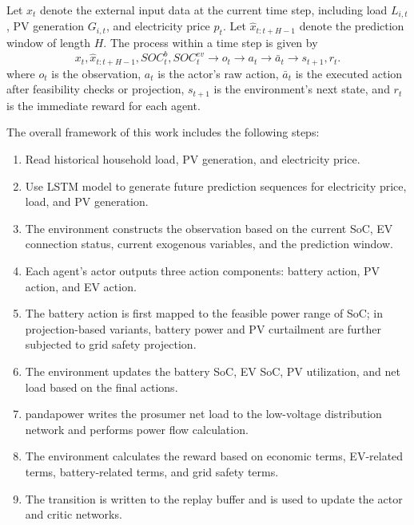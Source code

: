 Let \(x_t\) denote the external input data at the current time step, including load \(L_{i,t}\), PV generation \(G_{i,t}\), and electricity price \(p_t\). Let \(\hat{x}_{t:t+H-1}\) denote the prediction window of length \(H\). The process within a time step is given by
\[
  x_t,\hat{x}_{t:t+H-1},SOC^b_t,SOC^{ev}_t
  \rightarrow
  o_t
  \rightarrow
  a_t
  \rightarrow
  \bar a_t
  \rightarrow
  s_{t+1},r_t.
\]
where \(o_t\) is the observation, \(a_t\) is the actor's raw action, \(\bar a_t\) is the executed action after feasibility checks or projection, \(s_{t+1}\) is the environment's next state, and \(r_t\) is the immediate reward for each agent.

The overall framework of this work includes the following steps:
\begin{enumerate}
  \item Read historical household load, PV generation, and electricity price.
  \item Use LSTM model to generate future prediction sequences for electricity price, load, and PV generation.
  \item The environment constructs the observation based on the current SoC, EV connection status, current exogenous variables, and the prediction window.
  \item Each agent's actor outputs three action components: battery action, PV action, and EV action.
  \item The battery action is first mapped to the feasible power range of SoC; in projection-based variants, battery power and PV curtailment are further subjected to grid safety projection.
  \item The environment updates the battery SoC, EV SoC, PV utilization, and net load based on the final actions.
  \item pandapower writes the prosumer net load to the low-voltage distribution network and performs power flow calculation.
  \item The environment calculates the reward based on economic terms, EV-related terms, battery-related terms, and grid safety terms.
  \item The transition is written to the replay buffer and is used to update the actor and critic networks.
\end{enumerate}

